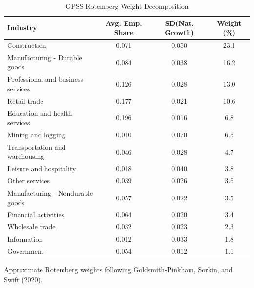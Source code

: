 \begin{table}[htbp]
\centering
\caption{GPSS Rotemberg Weight Decomposition}
\label{tab:gpss}
\begin{tabular}{lccc}
\hline\hline
Industry & Avg. Emp. Share & SD(Nat. Growth) & Weight (\%) \\
\hline
Construction & 0.071 & 0.050 & 23.1 \\
Manufacturing - Durable goods & 0.084 & 0.038 & 16.2 \\
Professional and business services & 0.126 & 0.028 & 13.0 \\
Retail trade & 0.177 & 0.021 & 10.6 \\
Education and health services & 0.196 & 0.016 & 6.8 \\
Mining and logging & 0.010 & 0.070 & 6.5 \\
Transportation and warehousing & 0.046 & 0.028 & 4.7 \\
Leisure and hospitality & 0.018 & 0.040 & 3.8 \\
Other services & 0.039 & 0.026 & 3.5 \\
Manufacturing - Nondurable goods & 0.057 & 0.022 & 3.5 \\
Financial activities & 0.064 & 0.020 & 3.4 \\
Wholesale trade & 0.032 & 0.023 & 2.3 \\
Information & 0.012 & 0.033 & 1.8 \\
Government & 0.054 & 0.012 & 1.1 \\
\hline\hline
\end{tabular}
\begin{tablenotes}\small
\item Approximate Rotemberg weights following Goldsmith-Pinkham, Sorkin, and Swift (2020).
\end{tablenotes}
\end{table}